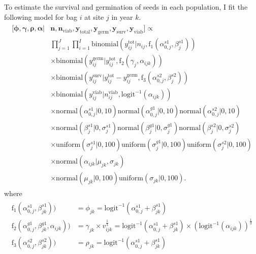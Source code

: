 \documentclass[12pt, oneside, titlepage]{article}   	%
\begin{document}
To estimate the survival and germination of seeds in each population, I fit the following model for bag $i$ at site $j$ in year $k$. 
%
\begin{align}
  \begin{split}
 [ \bm{\phi}, \bm{\gamma}, \bm{\rho}, \bm{\alpha} | & \bm{n}, \bm{n_{\mathrm{viab}}}, \bm{y_{\mathrm{total}}},  \bm{y_{\mathrm{germ}}},  \bm{y_{\mathrm{surv}}}, \bm{y_{\mathrm{viab}}} ] \propto \\
   & \prod_{j=1}^{J} \prod_{i=1}^{I} %
   \mathrm{binomial} ( y^{\mathrm{tot}}_{ij} | n_{ij}, \mathrm{f}_1(\alpha^{s1}_{0,j} , \beta^{s1}_{j} ) ) 
 \\ & \times \mathrm{binomial} ( y^{\mathrm{germ}}_{ij}  | y^{\mathrm{tot}}_{ij}  , \mathrm{f}_2( \gamma_{j} , \alpha_{ijk}) )
 \\ & \times \mathrm{binomial} ( y^{\mathrm{surv}}_{ij} | y^{\mathrm{tot}}_{ij}  -  y^{\mathrm{germ}}_{ij}   , \mathrm{f}_3(\alpha^{s2}_{0,j} , \beta^{s2}_{j} ) ) 
 \\ & \times  \mathrm{binomial} ( y^{\mathrm{viab}}_{ij} | n^{\mathrm{viab}}_{ij}, \mathrm{logit}^{-1}(\alpha_{ijk}) ) 
    \\ & \times \mathrm{normal} ( \alpha^{s1}_{0,j} | 0, 10) \mathrm{normal} ( \alpha^{g1}_{0,j} | 0, 10) \mathrm{normal} ( \alpha^{s2}_{0,j} | 0, 10)  
    \\ & \times \mathrm{normal} ( \beta^{s1}_{j} | 0, \sigma_j^{s1}) \mathrm{normal} ( \beta^{g1}_{j} | 0, \sigma_j^{g1}) \mathrm{normal} ( \beta^{s2}_{j} | 0, \sigma_j^{s2}) 
    \\ & \times \mathrm{uniform} ( \sigma_j^{s1} | 0, 100) \mathrm{uniform} ( \sigma_j^{g1} | 0, 100)  \mathrm{uniform} ( \sigma_j^{s2} | 0, 100)   
  \\ & \times \mathrm{normal} ( \alpha_{ijk}  | \mu_{jk}, \sigma_{jk} )
  \\ & \times \mathrm{normal} ( \mu_{jk} | 0 , 100 ) \mathrm{uniform} ( \sigma_{jk} | 0,100).
  \end{split}
\end{align}
%
where
%
\begin{align}
  \begin{split}
\mathrm{f}_1(\alpha^{s1}_{0,j} , \beta^{s1}_{jk} ) ) & =  \phi_{jk} = \mathrm{logit}^{-1}(\alpha^{s1}_{0,j} + \beta^{s1}_{jk}) \\
\mathrm{f}_2(\alpha^{g1}_{0,j} , \beta^{g1}_{jk},  \alpha_{ijk} ) ) & = \gamma_{jk} \times v_{ijk}^\frac{1}{3} = \mathrm{logit}^{-1}(\alpha^{s1}_{0,j} + \beta^{s1}_{jk}) \times ( \mathrm{logit}^{-1}(\alpha_{ijk}))^\frac{1}{3} \\
\mathrm{f}_3(\alpha^{s2}_{0,j} , \beta^{s2}_{jk} ) ) & =  \rho_{jk} = \mathrm{logit}^{-1}(\alpha^{s1}_{0,j} + \beta^{s1}_{jk})
  \end{split}
\end{align}
\end{document}
